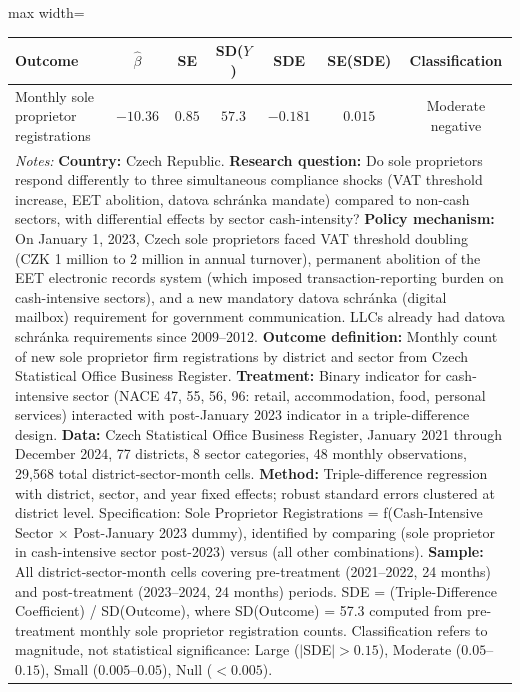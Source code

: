 \begin{table}[h]
\centering
\begin{adjustbox}{max width=\textwidth}
\begin{tabular}{lcccccc}
\toprule
\textbf{Outcome} & \textbf{$\hat{\beta}$} & \textbf{SE} & \textbf{SD($Y$)} & \textbf{SDE} & \textbf{SE(SDE)} & \textbf{Classification} \\
\midrule
Monthly sole proprietor registrations & $-10.36$ & $0.85$ & $57.3$ & $-0.181$ & $0.015$ & Moderate negative \\
\bottomrule
\multicolumn{7}{p{7in}}{
\small \textit{Notes:}
\textbf{Country:} Czech Republic.
\textbf{Research question:} Do sole proprietors respond differently to three simultaneous compliance shocks (VAT threshold increase, EET abolition, datova schr\'anka mandate) compared to non-cash sectors, with differential effects by sector cash-intensity?
\textbf{Policy mechanism:} On January 1, 2023, Czech sole proprietors faced VAT threshold doubling (CZK 1 million to 2 million in annual turnover), permanent abolition of the EET electronic records system (which imposed transaction-reporting burden on cash-intensive sectors), and a new mandatory datova schr\'anka (digital mailbox) requirement for government communication. LLCs already had datova schr\'anka requirements since 2009--2012.
\textbf{Outcome definition:} Monthly count of new sole proprietor firm registrations by district and sector from Czech Statistical Office Business Register.
\textbf{Treatment:} Binary indicator for cash-intensive sector (NACE 47, 55, 56, 96: retail, accommodation, food, personal services) interacted with post-January 2023 indicator in a triple-difference design.
\textbf{Data:} Czech Statistical Office Business Register, January 2021 through December 2024, 77 districts, 8 sector categories, 48 monthly observations, 29,568 total district-sector-month cells.
\textbf{Method:} Triple-difference regression with district, sector, and year fixed effects; robust standard errors clustered at district level. Specification: Sole Proprietor Registrations = f(Cash-Intensive Sector $\times$ Post-January 2023 dummy), identified by comparing (sole proprietor in cash-intensive sector post-2023) versus (all other combinations).
\textbf{Sample:} All district-sector-month cells covering pre-treatment (2021--2022, 24 months) and post-treatment (2023--2024, 24 months) periods.
SDE = (Triple-Difference Coefficient) / SD(Outcome), where SD(Outcome) = 57.3 computed from pre-treatment monthly sole proprietor registration counts. Classification refers to magnitude, not statistical significance: Large ($|$SDE$| > 0.15$), Moderate ($0.05$--$0.15$), Small ($0.005$--$0.05$), Null ($< 0.005$).
}
\end{tabular}
\end{adjustbox}
\end{table}
